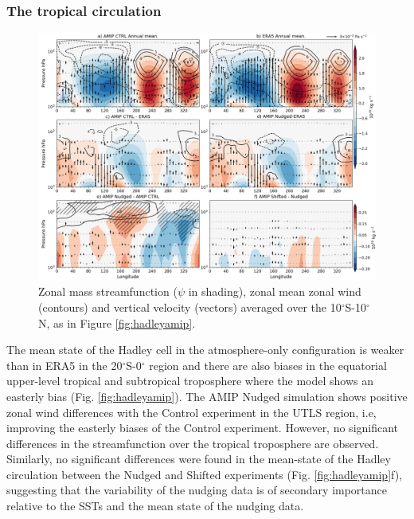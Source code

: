\subsubsection{The tropical circulation}

\begin{figure}[b!]
\centering
 \includegraphics[width=\linewidth]{figures/suite_streamwalkerclim.png}
\caption[Walker in atmosphere-only experiments]{Zonal mass streamfunction ($\psi$ in shading), zonal mean zonal wind (contours) and vertical velocity (vectors) averaged over the 10$^\circ$S-10$^\circ$N, as in Figure \ref{fig:hadleyamip}. }
\label{fig:walkeramip}
\end{figure}

The mean state of the Hadley cell in the atmosphere-only configuration is weaker than in ERA5 in the 20$^\circ$S-0$^\circ$ region and there are also biases in the equatorial upper-level tropical and subtropical troposphere where the model shows an easterly bias (Fig. \ref{fig:hadleyamip}). 
The AMIP Nudged simulation shows  positive zonal wind differences with the Control experiment in the UTLS region, i.e, improving the easterly biases of the Control experiment. However, no significant differences in the streamfunction over the tropical troposphere are observed. Similarly, no significant differences were found in the mean-state of the Hadley circulation between the Nudged and Shifted experiments (Fig. \ref{fig:hadleyamip}f), suggesting that the variability of the nudging data is of secondary importance relative to the SSTs and the mean state of the nudging data. 

